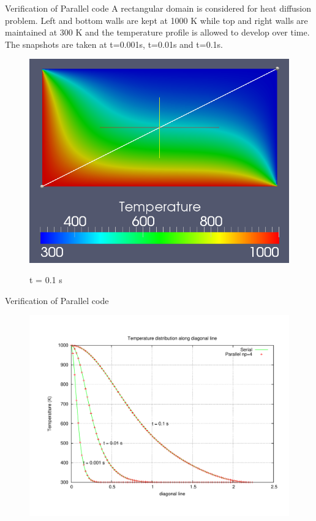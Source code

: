 \documentclass[t,english]{beamer}
\begin{document}
\begin{frame}{Verification of Parallel code}
A rectangular domain is considered for heat diffusion problem. Left and bottom walls are kept at 1000 K while top and right walls are maintained at 300 K and the temperature profile is allowed to develop over time. The snapshots are taken at t=0.001s, t=0.01s and t=0.1s.
\begin{figure}[!htb]
\centering
\includegraphics[trim=0 0 0 50,scale=0.22]{./verification_paraview.png}

t = 0.1 s
\end{figure}
\end{frame}

\begin{frame}{Verification of Parallel code}
\begin{figure}[!htb]
\centering
\includegraphics[trim=0 0 0 50,scale=0.3]{./verification_par.pdf}

\end{figure}
\end{frame}
\end{document}
